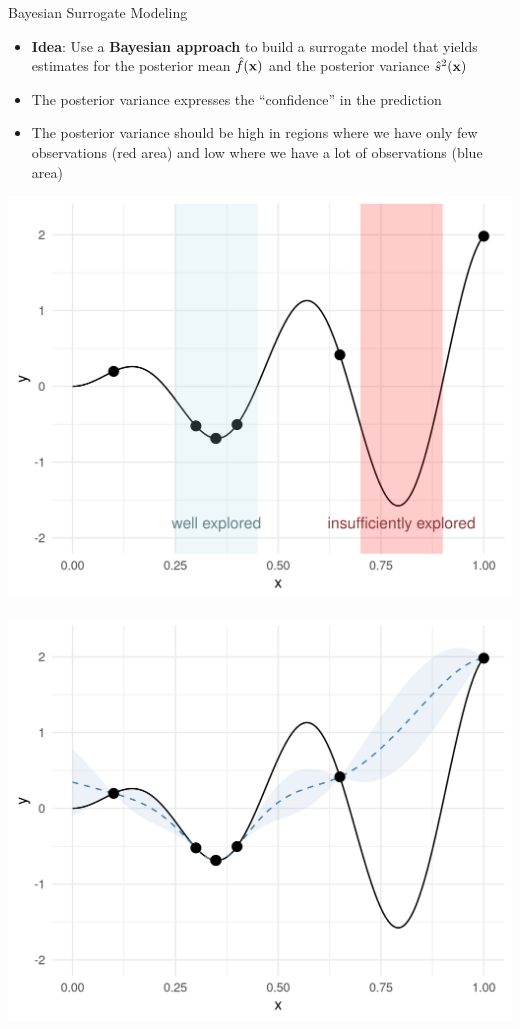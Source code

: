 \documentclass[11pt,compress,t,notes=noshow, xcolor=table]{beamer}
\begin{document}
\begin{vbframe}{Bayesian Surrogate Modeling}
\begin{itemize}
\item \textbf{Idea}: Use a \textbf{Bayesian approach} to build a surrogate model that yields estimates for the posterior mean $\hat{f}(\mathbf{x})$ and the posterior variance $\hat{s}^2(\mathbf{x})$
\item The posterior variance expresses the \enquote{confidence} in the prediction
\item The posterior variance should be high in regions where we have only few observations (red area) and low where we have a lot of observations (blue area)
\end{itemize}
\begin{minipage}[b]{0.45\textwidth}
  \includegraphics[width = \textwidth]{figure_man/bayesian_loop_ee.png}
\end{minipage}
\hfill
\begin{minipage}[b]{0.45\textwidth}
  \includegraphics[width = \textwidth]{figure_man/bayesian_loop_sm.png}
\end{minipage}


\end{vbframe}
\end{document}
